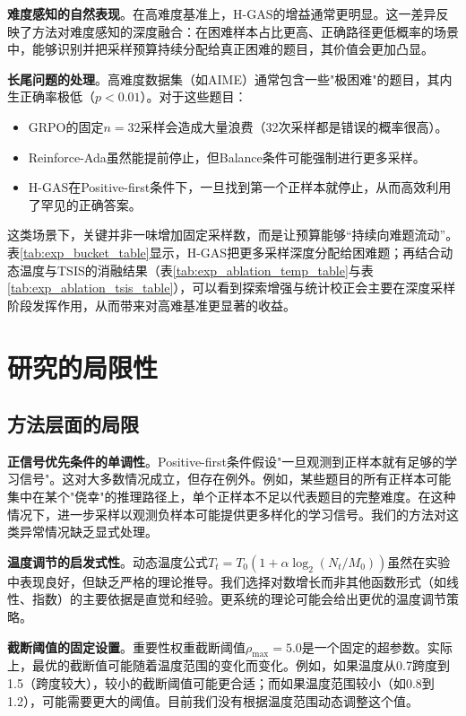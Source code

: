 \textbf{难度感知的自然表现}。在高难度基准上，H-GAS的增益通常更明显。这一差异反映了方法对难度感知的深度融合：在困难样本占比更高、正确路径更低概率的场景中，能够识别并把采样预算持续分配给真正困难的题目，其价值会更加凸显。

\textbf{长尾问题的处理}。高难度数据集（如AIME）通常包含一些"极困难"的题目，其内生正确率极低（$p < 0.01$）。对于这些题目：
\begin{itemize}
    \item GRPO的固定$n=32$采样会造成大量浪费（32次采样都是错误的概率很高）。
    \item Reinforce-Ada虽然能提前停止，但Balance条件可能强制进行更多采样。
    \item H-GAS在Positive-first条件下，一旦找到第一个正样本就停止，从而高效利用了罕见的正确答案。
\end{itemize}

这类场景下，关键并非一味增加固定采样数，而是让预算能够“持续向难题流动”。表\ref{tab:exp_bucket_table}显示，H-GAS把更多采样深度分配给困难题；再结合动态温度与TSIS的消融结果（表\ref{tab:exp_ablation_temp_table}与表\ref{tab:exp_ablation_tsis_table}），可以看到探索增强与统计校正会主要在深度采样阶段发挥作用，从而带来对高难基准更显著的收益。

\section{研究的局限性}
\label{sec:limitations}

\subsection{方法层面的局限}
\label{subsec:method_limitations}

\textbf{正信号优先条件的单调性}。Positive-first条件假设"一旦观测到正样本就有足够的学习信号"。这对大多数情况成立，但存在例外。例如，某些题目的所有正样本可能集中在某个"侥幸"的推理路径上，单个正样本不足以代表题目的完整难度。在这种情况下，进一步采样以观测负样本可能提供更多样化的学习信号。我们的方法对这类异常情况缺乏显式处理。

\textbf{温度调节的启发式性}。动态温度公式$T_t = T_0(1 + \alpha \log_2(N_t / M_0))$虽然在实验中表现良好，但缺乏严格的理论推导。我们选择对数增长而非其他函数形式（如线性、指数）的主要依据是直觉和经验。更系统的理论可能会给出更优的温度调节策略。

\textbf{截断阈值的固定设置}。重要性权重截断阈值$\rho_{\max} = 5.0$是一个固定的超参数。实际上，最优的截断值可能随着温度范围的变化而变化。例如，如果温度从0.7跨度到1.5（跨度较大），较小的截断阈值可能更合适；而如果温度范围较小（如0.8到1.2），可能需要更大的阈值。目前我们没有根据温度范围动态调整这个值。

